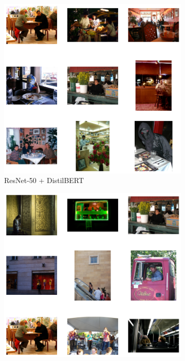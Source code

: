 \documentclass[11pt]{article}
\begin{document}
\begin{figure}[H]
    \centering
    \begin{subfigure}[b]{0.3\textwidth}
        \includegraphics[width=\linewidth]{Q2/All kinds of food on a table/1.png}
        \caption{\tiny ResNet-50 + DistilBERT}
    \end{subfigure}
    \hfill
    \begin{subfigure}[b]{0.3\textwidth}
        \includegraphics[width=\linewidth]{Q2/All kinds of food on a table/2.png}

\end{subfigure}
\end{figure}
\end{document}
